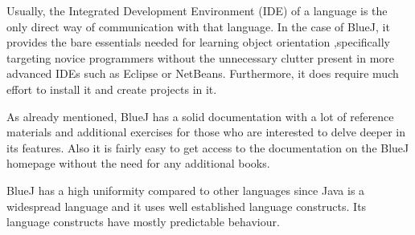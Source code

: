 \begin{description}[style=nextline]
\item[Environment]
Usually, the Integrated Development Environment (IDE) of a language is the only direct way of communication with that language. In the case of BlueJ, it provides the bare essentials needed for learning object orientation
,specifically targeting novice programmers without the unnecessary clutter present in more advanced IDEs such as Eclipse or NetBeans. Furthermore, it does require much effort to install it and create projects in it.
\item[Documentation]
As already mentioned, BlueJ has a solid documentation with a lot of reference materials and additional exercises for those who are interested to delve deeper in its features. Also it is fairly easy to get access to the documentation on the BlueJ homepage without the need for any additional books.
\item[Uniformity]
BlueJ has a high uniformity compared to other languages since Java is a widespread language and it uses well established language constructs. Its language constructs have mostly predictable behaviour.
\end{description}
